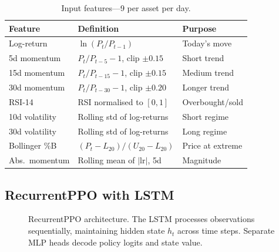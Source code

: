 \documentclass[12pt,a4paper]{article}
\begin{document}
\begin{table}[H]
\centering
\caption{Input features---9 per asset per day.}
\label{tab:features}
\begin{tabular}{lll}
\toprule
\textbf{Feature} & \textbf{Definition} & \textbf{Purpose} \\
\midrule
Log-return        & $\ln(P_t/P_{t-1})$                     & Today's move \\
5d momentum       & $P_t/P_{t-5}-1$, clip $\pm0.15$        & Short trend \\
15d momentum      & $P_t/P_{t-15}-1$, clip $\pm0.15$       & Medium trend \\
30d momentum      & $P_t/P_{t-30}-1$, clip $\pm0.20$       & Longer trend \\
RSI-14            & RSI normalised to $[0,1]$              & Overbought/sold \\
10d volatility    & Rolling std of log-returns             & Short regime \\
30d volatility    & Rolling std of log-returns             & Long regime \\
Bollinger \%B     & $(P_t-L_{20})/(U_{20}-L_{20})$         & Price at extreme \\
Abs.\ momentum    & Rolling mean of $|\mathrm{lr}|$, 5d    & Magnitude \\
\bottomrule
\end{tabular}
\end{table}

\subsection{RecurrentPPO with LSTM}

\begin{figure}[H]
\centering
{}
\caption{RecurrentPPO architecture. The LSTM processes observations
sequentially, maintaining hidden state $h_t$ across time steps.
Separate MLP heads decode policy logits and state value.}
\label{fig:arch}
\end{figure}
\end{document}
